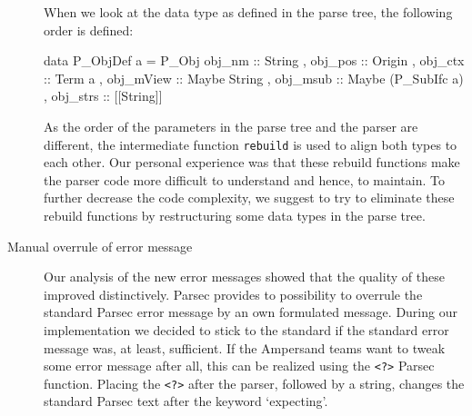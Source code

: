 \begin{description}
   When we look at the data type as defined in the parse tree, the following order is defined:
   \begin{haskell}
         data P_ObjDef a =
                  P_Obj { obj_nm :: String          
                             , obj_pos :: Origin  
                             , obj_ctx :: Term a
                             , obj_mView :: Maybe String 
                             , obj_msub :: Maybe (P_SubIfc a)  
                             , obj_strs :: [[String]]
                             }
    \end{haskell}

    As the order of the parameters in the parse tree and the parser are different, the intermediate function \texttt{rebuild} is used to align both types to each other.
   Our personal experience was that these rebuild functions make the parser code more difficult to understand and hence, to maintain.
   To further decrease the code complexity, we suggest to try to eliminate these rebuild functions by restructuring some data types in the parse tree.

  \item[Manual overrule of error message]
    Our analysis of the new error messages showed that the quality of these improved distinctively.
    Parsec provides to possibility to overrule the standard Parsec error message by an own formulated message.
    During our implementation we decided to stick to the standard if the standard error message was, at least, sufficient.
    If the Ampersand teams want to tweak some error message after all, this can be realized using the \texttt{<?>} Parsec function.
    Placing the \texttt{<?>} after the parser, followed by a string, changes the standard Parsec text after the keyword `expecting'.

\end{description}
